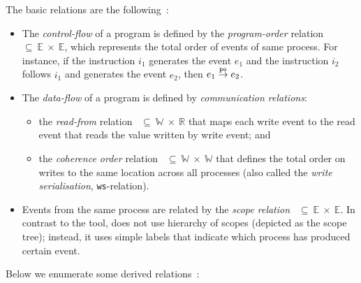 \vspace{1em}
The basic relations are the following~\cite{alglave2010shared}:
\begin{itemize}
    \item The \textit{control-flow} of a program is defined by the \textit{program-order} relation \po~$\subseteq~\mathbb{E}~\times~\mathbb{E}$, which represents the total order of events of same process.
    For instance, if the instruction $i_1$ generates the event $e_1$ and the instruction $i_2$ follows $i_1$ and generates the event $e_2$, then $e_1 \overset{\texttt{po}}{\rightarrow} e_2$.

    \item The \textit{data-flow} of a program is defined by \textit{communication relations}:
    \begin{itemize}[noitemsep]
        \item the \textit{read-from} relation \rf{}~$\subseteq~\mathbb{W}~\times~\mathbb{R}$ that maps each write event to the read event that reads the value written by write event; and
        \item the \textit{coherence order} relation \co{}~$\subseteq~\mathbb{W}~\times~\mathbb{W}$ that defines the total order on writes to the same location across all processes (also called the \textit{write serialisation}, \texttt{ws}-relation).
    \end{itemize}

    \item Events from the same process are related by the \textit{scope relation} \sr{}~$\subseteq~\mathbb{E}~\times~\mathbb{E}$.
    In contrast to the  tool, \porthos[2] does not use hierarchy of scopes (depicted as the scope tree); instead, it uses simple labels that indicate which process has produced certain event.
\end{itemize}


Below we enumerate some derived relations~\cite{alglave2010shared}:

